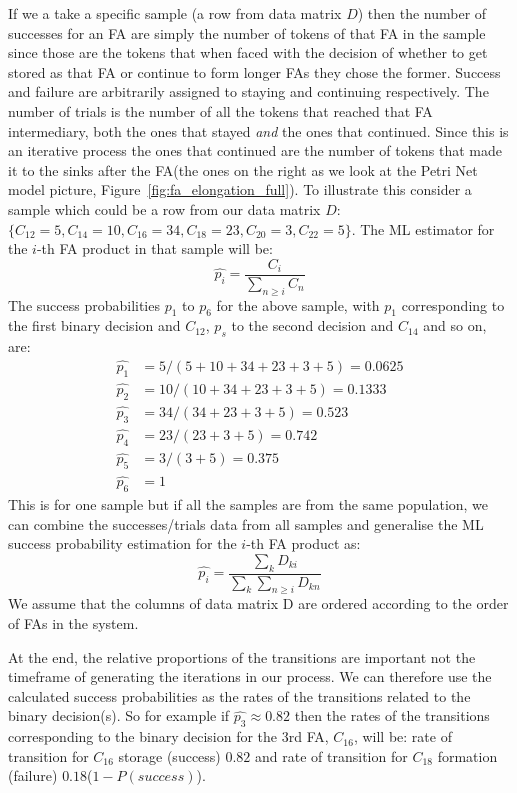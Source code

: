 If we a take a specific sample (a row from data matrix $D$) then the
number of successes for an FA are simply the number of tokens of
that FA in the sample since those are the tokens that when faced with
the decision of whether to get stored as that FA or continue to form
longer FAs they chose the former. Success and failure are arbitrarily
assigned to staying and continuing respectively. The number of trials
is the number of all the tokens that reached that FA intermediary, both
the ones that stayed \textit{and} the ones that continued. Since this
is an iterative process the ones that continued are the number of
tokens that made it to the sinks after the FA(the ones on the right as
we look at the Petri Net model picture,
Figure~\ref{fig:fa_elongation_full}). To illustrate this consider a
sample which could be a row from our data matrix $D$: $\{C_{12}=5,
C_{14}=10, C_{16}=34, C_{18}=23, C_{20}=3, C_{22}=5\}$. The ML
estimator for the $i$-th FA product in that sample will be:
\begin{equation*}
\hat{p_i} = \frac{C_i}{\sum_{n \geq i} C_n}
\end{equation*}
The success probabilities $p_1$ to $p_6$ for the above sample, with $p_1$ corresponding to
the first binary decision and $C_{12}$, $p_s$ to the second decision
and $C_{14}$ and so on, are:
\begin{align*}
\hat{p_1} & = 5/(5+10+34+23+3+5) = 0.0625\\
\hat{p_2} & = 10 / (10+34+23+3+5) = 0.1333\\
\hat{p_3} & = 34 / (34+23+3+5) = 0.523\\
\hat{p_4} & = 23 / (23+3+5) = 0.742\\
\hat{p_5} & = 3 / (3+5) = 0.375\\
\hat{p_6} & = 1
\end{align*}
This is for one sample but if all the samples are from the same
population, we can combine the successes/trials data from all
samples and generalise the ML success probability estimation for the
$i$-th FA product as:
\begin{equation*}
\hat{p_i} = \frac{\sum_k D_{ki}}{\sum_k \sum_{n\geq i} D_{kn}}
\end{equation*}
We assume that the columns of data matrix D are ordered according to
the order of FAs in the system.

At the end, the relative proportions of the transitions are important not the timeframe of generating the iterations in our process. We can therefore
use the calculated success probabilities as the rates of the
transitions related to the binary decision(s). So for example if
$\hat{p_3}\approx0.82$ then the rates of the transitions corresponding to the
binary decision for the 3rd FA, $C_{16}$, will be: rate of transition
for $C_{16}$ storage (success) $0.82$ and rate of transition for
$C_{18}$ formation (failure) $0.18$($1-P(success)$).


